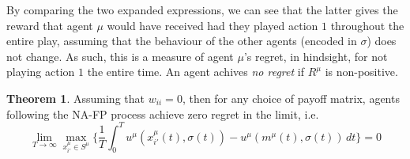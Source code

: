 \documentclass{article}
\theoremstyle{definition}
\newtheorem*{definition}{Definition}
\newtheorem{theorem}{Theorem}
\begin{document}
	By comparing the two expanded expressions, we can see that the latter gives the reward that agent $\mu$ would have received had they played action $1$ throughout the entire play, assuming that the behaviour of the other agents (encoded in $\sigma$) does not change. As such, this is a measure of agent $\mu$'s regret, in hindsight, for not playing action $1$ the entire time. An agent achives \emph{no regret} if $R^\mu$ is non-positive.


	\begin{theorem}
		Assuming that $w_{ii} = 0$, then for any choice of payoff matrix, agents following the NA-FP process achieve zero regret in the limit, i.e.
		\begin{equation}
			\lim_{T \rightarrow \infty} \max_{x_{i'}^\mu \in S^\mu} \Big\{ \frac{1}{T} \int_{0}^{T} u^{\mu}(x_{i'}^\mu(t), \sigma(t)) - u^{\mu}(m^\mu(t), \sigma(t)) \, dt \Big\} = 0
		\end{equation}

	\end{theorem}
	
\end{document}
